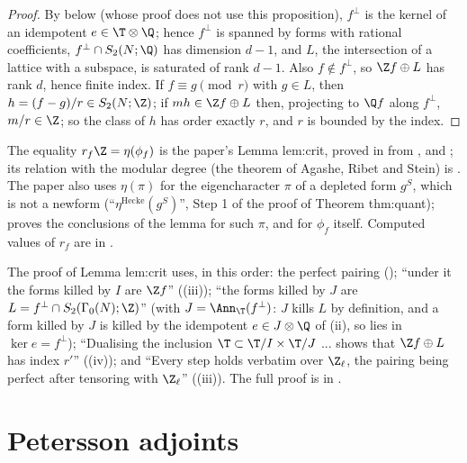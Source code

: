 \begin{proof}
By  below (whose proof does not use this proposition), $f^\perp$ is the kernel of an idempotent $e\in\T\otimes\Q$; hence $f^\perp$ is spanned by forms with
rational coefficients, $f^\perp\cap S_2(N;\Q)$ has dimension $d-1$, and $L$, the intersection of a lattice with a subspace, is saturated of rank $d-1$. Also $f\notin f^\perp$, so
$\Z f\oplus L$ has rank $d$, hence finite index. If $f\equiv g\pmod r$ with $g\in L$, then $h=(f-g)/r\in S_2(N;\Z)$; if $mh\in\Z f\oplus L$ then, projecting to $\Q f$ along $f^\perp$, $m/r\in\Z$; so the
class of $h$ has order exactly $r$, and $r$ is bounded by the index.
\end{proof}

The equality $r_f\Z=\eta(\phi_f)$ is the paper's Lemma lem:crit, proved in  from ,  and
; its relation with the modular degree (the theorem of Agashe, Ribet and Stein) is . The paper also uses $\eta(\pi)$ for the
eigencharacter $\pi$ of a depleted form $g^S$, which is not a newform (``$\eta^{\mathrm{Hecke}}(g^S)$'', Step 1 of the proof of Theorem thm:quant); 
proves the conclusions of the lemma for such $\pi$, and for $\phi_f$ itself. Computed values of $r_f$ are in .

\begin{paperlink}\label{pl:hecke:crit-pairing}
The proof of Lemma lem:crit uses, in this order: the perfect pairing (); ``under it the forms killed by $I$ are $\Z f$'' ((iii));
``the forms killed by $J$ are $L=f^\perp\cap S_2(\Gamma_0(N);\Z)$'' (with $J=\Ann_\T(f^\perp)$: $J$ kills $L$ by definition, and a form killed by
$J$ is killed by the idempotent $e\in J\otimes\Q$ of (ii), so lies in $\ker e=f^\perp$); ``Dualising the inclusion $\T\subset\T/I\times\T/J$
... shows that $\Z f\oplus L$ has index $r'$'' ((iv)); and ``Every step holds verbatim over $\Z_\ell$, the pairing being perfect after tensoring with
$\Z_\ell$'' ((iii)). The full proof is in .
\end{paperlink}

\section{Petersson adjoints}\label{sec:hecke:adjoints}


